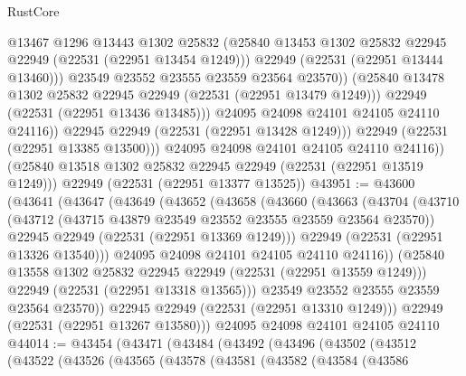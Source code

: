 \begin{lexlean}{RustCore}
\begin{coremodule}
                        @13467
                        @1296
                        @13443
                        @1302
                        @25832
                        (@25840 @13453 @1302 @25832 @22945 @22949 (@22531 (@22951 @13454 @1249)))
                        @22949
                        (@22531 (@22951 @13444 @13460)))
                      @23549
                      @23552
                      @23555
                      @23559
                      @23564
                      @23570))
                  (@25840 @13478 @1302 @25832 @22945 @22949 (@22531 (@22951 @13479 @1249)))
                  @22949
                  (@22531 (@22951 @13436 @13485)))
                @24095
                @24098
                @24101
                @24105
                @24110
                @24116))
            @22945
            @22949
            (@22531 (@22951 @13428 @1249)))
          @22949
          (@22531 (@22951 @13385 @13500)))
        @24095
        @24098
        @24101
        @24105
        @24110
        @24116))
    (@25840 @13518 @1302 @25832 @22945 @22949 (@22531 (@22951 @13519 @1249)))
    @22949
    (@22531 (@22951 @13377 @13525))
@43951 := @43600
    (@43641
      (@43647
        (@43649
          (@43652
            (@43658
              (@43660
                (@43663
                  (@43704
                    (@43710
                      (@43712 (@43715 @43879 @23549 @23552 @23555 @23559 @23564 @23570))
                      @22945
                      @22949
                      (@22531 (@22951 @13369 @1249)))
                    @22949
                    (@22531 (@22951 @13326 @13540)))
                  @24095
                  @24098
                  @24101
                  @24105
                  @24110
                  @24116))
              (@25840 @13558 @1302 @25832 @22945 @22949 (@22531 (@22951 @13559 @1249)))
              @22949
              (@22531 (@22951 @13318 @13565)))
            @23549
            @23552
            @23555
            @23559
            @23564
            @23570))
        @22945
        @22949
        (@22531 (@22951 @13310 @1249)))
      @22949
      (@22531 (@22951 @13267 @13580)))
    @24095
    @24098
    @24101
    @24105
    @24110
@44014 := @43454
    (@43471
      (@43484
        (@43492
          (@43496
            (@43502
              (@43512
                (@43522
                  (@43526
                    (@43565
                      (@43578
                        (@43581
                          (@43582
                            (@43584
                              (@43586

\end{coremodule}
\end{lexlean}
